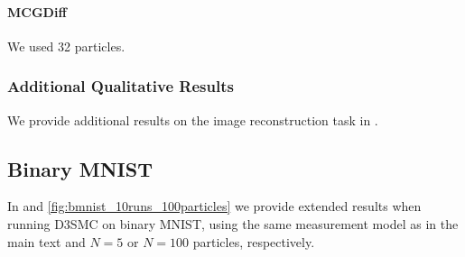 \paragraph{MCGDiff}
We used 32 particles. 

\subsubsection{Additional Qualitative Results}
We provide additional results on the image reconstruction task in .




\subsection{Binary MNIST}
\label{app:bmnist}
In  and \ref{fig:bmnist_10runs_100particles} we provide extended results when running D3SMC on binary MNIST, using the same measurement model as in the main text and $N=5$ or $N=100$ particles, respectively.
 

